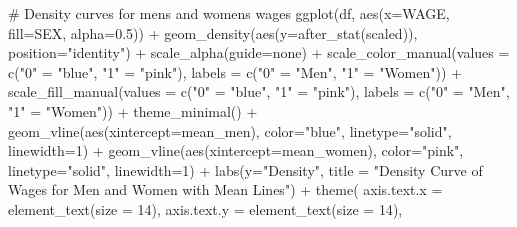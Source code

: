 \documentclass[
  letterpaper,
  DIV=11,
  numbers=noendperiod]{scrartcl}
\newenvironment{Shaded}{\begin{snugshade}}{\end{snugshade}}
\newcommand{\AttributeTok}[1]{\textcolor[rgb]{0.40,0.45,0.13}{#1}}
\newcommand{\CommentTok}[1]{\textcolor[rgb]{0.37,0.37,0.37}{#1}}
\newcommand{\DecValTok}[1]{\textcolor[rgb]{0.68,0.00,0.00}{#1}}
\newcommand{\FloatTok}[1]{\textcolor[rgb]{0.68,0.00,0.00}{#1}}
\newcommand{\FunctionTok}[1]{\textcolor[rgb]{0.28,0.35,0.67}{#1}}
\newcommand{\NormalTok}[1]{\textcolor[rgb]{0.00,0.23,0.31}{#1}}
\newcommand{\OtherTok}[1]{\textcolor[rgb]{0.00,0.23,0.31}{#1}}
\newcommand{\SpecialCharTok}[1]{\textcolor[rgb]{0.37,0.37,0.37}{#1}}
\newcommand{\StringTok}[1]{\textcolor[rgb]{0.13,0.47,0.30}{#1}}
\begin{document}
\begin{Shaded}
\begin{Highlighting}[]
\CommentTok{\# Density curves for men\textquotesingle{}s and women\textquotesingle{}s wages}
\FunctionTok{ggplot}\NormalTok{(df, }\FunctionTok{aes}\NormalTok{(}\AttributeTok{x=}\NormalTok{WAGE, }\AttributeTok{fill=}\NormalTok{SEX, }\AttributeTok{alpha=}\FloatTok{0.5}\NormalTok{)) }\SpecialCharTok{+} 
  \FunctionTok{geom\_density}\NormalTok{(}\FunctionTok{aes}\NormalTok{(}\AttributeTok{y=}\FunctionTok{after\_stat}\NormalTok{(scaled)), }\AttributeTok{position=}\StringTok{"identity"}\NormalTok{) }\SpecialCharTok{+}
  \FunctionTok{scale\_alpha}\NormalTok{(}\AttributeTok{guide=}\StringTok{\textquotesingle{}none\textquotesingle{}}\NormalTok{) }\SpecialCharTok{+}
  \FunctionTok{scale\_color\_manual}\NormalTok{(}\AttributeTok{values =} \FunctionTok{c}\NormalTok{(}\StringTok{"0"} \OtherTok{=} \StringTok{"blue"}\NormalTok{, }\StringTok{"1"} \OtherTok{=} \StringTok{"pink"}\NormalTok{),}
                     \AttributeTok{labels =} \FunctionTok{c}\NormalTok{(}\StringTok{"0"} \OtherTok{=} \StringTok{"Men"}\NormalTok{, }\StringTok{"1"} \OtherTok{=} \StringTok{"Women"}\NormalTok{)) }\SpecialCharTok{+}
  \FunctionTok{scale\_fill\_manual}\NormalTok{(}\AttributeTok{values =} \FunctionTok{c}\NormalTok{(}\StringTok{"0"} \OtherTok{=} \StringTok{"blue"}\NormalTok{, }\StringTok{"1"} \OtherTok{=} \StringTok{"pink"}\NormalTok{),}
                     \AttributeTok{labels =} \FunctionTok{c}\NormalTok{(}\StringTok{"0"} \OtherTok{=} \StringTok{"Men"}\NormalTok{, }\StringTok{"1"} \OtherTok{=} \StringTok{"Women"}\NormalTok{)) }\SpecialCharTok{+}
  \FunctionTok{theme\_minimal}\NormalTok{() }\SpecialCharTok{+}
  \FunctionTok{geom\_vline}\NormalTok{(}\FunctionTok{aes}\NormalTok{(}\AttributeTok{xintercept=}\NormalTok{mean\_men), }\AttributeTok{color=}\StringTok{"blue"}\NormalTok{, }\AttributeTok{linetype=}\StringTok{"solid"}\NormalTok{, }\AttributeTok{linewidth=}\DecValTok{1}\NormalTok{) }\SpecialCharTok{+} 
  \FunctionTok{geom\_vline}\NormalTok{(}\FunctionTok{aes}\NormalTok{(}\AttributeTok{xintercept=}\NormalTok{mean\_women), }\AttributeTok{color=}\StringTok{"pink"}\NormalTok{, }\AttributeTok{linetype=}\StringTok{"solid"}\NormalTok{, }\AttributeTok{linewidth=}\DecValTok{1}\NormalTok{) }\SpecialCharTok{+}
  \FunctionTok{labs}\NormalTok{(}\AttributeTok{y=}\StringTok{"Density"}\NormalTok{, }\AttributeTok{title =} \StringTok{"Density Curve of Wages for Men and Women with Mean Lines"}\NormalTok{) }\SpecialCharTok{+}
  \FunctionTok{theme}\NormalTok{(}
    \AttributeTok{axis.text.x =} \FunctionTok{element\_text}\NormalTok{(}\AttributeTok{size =} \DecValTok{14}\NormalTok{),}
    \AttributeTok{axis.text.y =} \FunctionTok{element\_text}\NormalTok{(}\AttributeTok{size =} \DecValTok{14}\NormalTok{),}

\end{Highlighting}
\end{Shaded}
\end{document}
